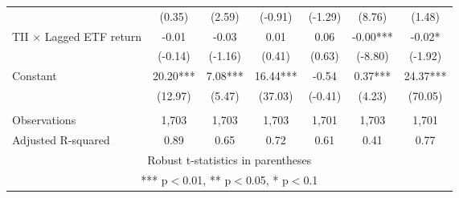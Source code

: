 \documentclass[]{article}
\begin{document}
\begin{tabular}{lcccccc}
 & (0.35) & (2.59) & (-0.91) & (-1.29) & (8.76) & (1.48) \\
TII $\times$ Lagged ETF return & -0.01 & -0.03 & 0.01 & 0.06 & -0.00*** & -0.02* \\
 & (-0.14) & (-1.16) & (0.41) & (0.63) & (-8.80) & (-1.92) \\
Constant & 20.20*** & 7.08*** & 16.44*** & -0.54 & 0.37*** & 24.37*** \\
 & (12.97) & (5.47) & (37.03) & (-0.41) & (4.23) & (70.05) \\
 &  &  &  &  &  &  \\
Observations & 1,703 & 1,703 & 1,703 & 1,701 & 1,703 & 1,701 \\
 Adjusted R-squared & 0.89 & 0.65 & 0.72 & 0.61 & 0.41 & 0.77 \\ \hline
\multicolumn{7}{c}{ Robust t-statistics in parentheses} \\
\multicolumn{7}{c}{ *** p$<$0.01, ** p$<$0.05, * p$<$0.1} \\
\end{tabular}
\end{document}
